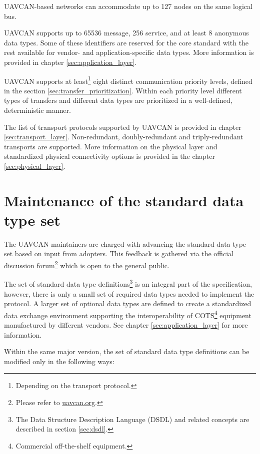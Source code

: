 UAVCAN-based networks can accommodate up to 127 nodes on the same logical bus.

UAVCAN supports up to 65536 message, 256 service, and at least 8 anonymous data types.
Some of these identifiers are reserved for the core standard with 
the rest available for vendor- and application-specific data types.
More information is provided in chapter \ref{sec:application_layer}.

UAVCAN supports at least\footnote{Depending on the transport protocol.} eight distinct communication priority levels,
defined in the section \ref{sec:transfer_prioritization}.
Within each priority level different types of transfers and different data types are
prioritized in a well-defined, deterministic manner.

The list of transport protocols supported by UAVCAN is provided in chapter \ref{sec:transport_layer}.
Non-redundant, doubly-redundant and triply-redundant transports are supported.
More information on the physical layer and standardized physical connectivity options
is provided in the chapter \ref{sec:physical_layer}.

\section{Maintenance of the standard data type set}

The UAVCAN maintainers are charged with advancing the standard data type set based on input from adopters.
This feedback is gathered via the official discussion
forum\footnote{Please refer to \href{http://uavcan.org}{uavcan.org}.}
which is open to the general public.

The set of standard data type definitions\footnote{The Data Structure Description Language (DSDL) and related concepts are described in section \ref{sec:dsdl}.}
is an integral part of the specification, however, there is only a small set of required data types needed to implement the protocol.
A larger set of optional data types are defined to create a standardized data exchange environment
supporting the interoperability of COTS\footnote{Commercial off-the-shelf equipment.} equipment manufactured by different vendors.
See chapter \ref{sec:application_layer} for more information.


Within the same major version, the set of standard data type definitions can be modified only in the following ways:

